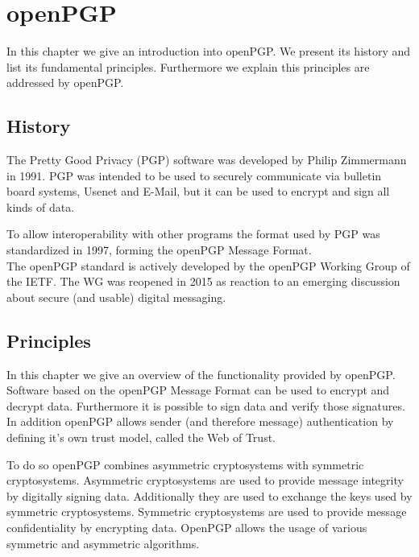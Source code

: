 \chapter{openPGP} \label{chapter:openpgp}

In this chapter we give an introduction into openPGP. 
We present its history and list its fundamental principles.
 Furthermore we explain this principles are addressed by openPGP.


\section{History}

The Pretty Good Privacy (PGP) software was developed by Philip Zimmermann in 1991.  
PGP was intended to be used to securely communicate via bulletin board systems, Usenet and E-Mail, but it can be used to encrypt and sign all kinds of data.


To allow interoperability with other programs the format used by PGP was standardized in 1997, forming the openPGP Message Format. \\


The openPGP standard is actively developed by the openPGP Working Group of the IETF. The WG was reopened in 2015 as reaction to an emerging discussion about secure (and usable) digital messaging.


\section{Principles} \label{section:openpgp:principles}

In this chapter we give an overview of the functionality provided by openPGP. 
Software based on the openPGP Message Format can be used to encrypt and decrypt data. Furthermore it is possible to sign data and verify those signatures. In addition openPGP allows sender (and therefore message) authentication by defining it's own trust model, called the Web of Trust. 

To do so openPGP combines asymmetric cryptosystems with symmetric cryptosystems. Asymmetric cryptosystems are used to provide message integrity by digitally signing data. Additionally they are used to exchange the keys used by symmetric cryptosystems. Symmetric cryptosystems are used to provide message confidentiality by encrypting data. OpenPGP allows the usage of various symmetric and asymmetric algorithms. 

